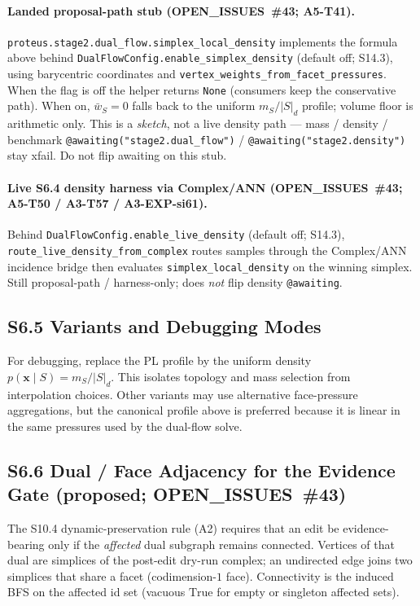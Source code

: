 \documentclass[11pt]{article}
\begin{document}
\paragraph{Landed proposal-path stub (OPEN\_ISSUES~\#43; A5-T41).}
\texttt{proteus.stage2.dual\_flow.simplex\_local\_density} implements the
formula above behind \texttt{DualFlowConfig.enable\_simplex\_density}
(default off; S14.3), using barycentric coordinates and
\texttt{vertex\_weights\_from\_facet\_pressures}. When the flag is off the
helper returns \texttt{None} (consumers keep the conservative path). When on,
$\bar w_S{=}0$ falls back to the uniform $m_S/|S|_d$ profile; volume floor is
arithmetic only. This is a \emph{sketch}, not a live density path --- mass /
density / benchmark \texttt{@awaiting("stage2.dual\_flow")} /
\texttt{@awaiting("stage2.density")} stay xfail. Do not flip awaiting on this
stub.

\paragraph{Live S6.4 density harness via Complex/ANN (OPEN\_ISSUES~\#43;
A5-T50 / A3-T57 / A3-EXP-si61).}
Behind \texttt{DualFlowConfig.enable\_live\_density} (default off; S14.3),
\texttt{route\_live\_density\_from\_complex} routes samples through the
Complex/ANN incidence bridge then evaluates
\texttt{simplex\_local\_density} on the winning simplex. Still
proposal-path / harness-only; does \emph{not} flip density
\texttt{@awaiting}.

\subsection*{S6.5 Variants and Debugging Modes}
For debugging, replace the PL profile by the uniform density $p(\mathbf x\mid S)=m_S/|S|_d$. This isolates topology and mass selection from interpolation choices. Other variants may use alternative face-pressure aggregations, but the canonical profile above is preferred because it is linear in the same pressures used by the dual-flow solve.

\subsection*{S6.6 Dual / Face Adjacency for the Evidence Gate (proposed;
OPEN\_ISSUES~\#43)}
\label{sec:si-dual-adjacency}
The S10.4 dynamic-preservation rule (A2) requires that an edit be
evidence-bearing only if the \emph{affected} dual subgraph remains connected.
Vertices of that dual are simplices of the post-edit dry-run complex; an
undirected edge joins two simplices that share a facet (codimension-$1$ face).
Connectivity is the induced BFS on the affected id set (vacuous $\mathrm{True}$
for empty or singleton affected sets).
\end{document}
